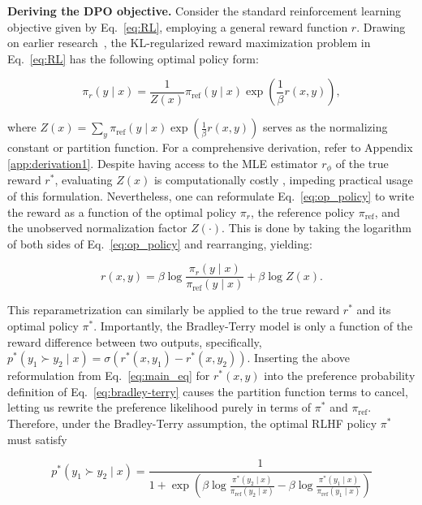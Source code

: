 \textbf{Deriving the DPO objective.} Consider the standard reinforcement learning objective given by Eq.~\ref{eq:RL}, employing a general reward function $r$. Drawing on earlier research~\citep{peters2007reinforcement, peng2019advantage, korbak2022reinforcement, go2023aligning}, the KL-regularized reward maximization problem in Eq.~\ref{eq:RL} has the following optimal policy form:

\begin{equation}\label{eq:op_policy}
    \pi_r(y\mid x) = \frac{1}{Z(x)}\pi_\text{ref}(y\mid x)\exp\left(\frac{1}{\beta}r(x, y)\right),
\end{equation}

where $Z(x) =\sum_{y}\pi_\text{ref}(y\mid x)\exp\left(\frac{1}{\beta}r(x, y)\right)$ serves as the normalizing constant or partition function. For a comprehensive derivation, refer to Appendix \ref{app:derivation1}. Despite having access to the MLE estimator $r_{\phi}$ of the true reward $r^*$, evaluating $Z(x)$ is computationally costly \citep{korbak2022reinforcement, go2023aligning}, impeding practical usage of this formulation. Nevertheless, one can reformulate Eq.~\ref{eq:op_policy} to write the reward as a function of the optimal policy $\pi_r$, the reference policy $\pi_\text{ref}$, and the unobserved normalization factor $Z(\cdot)$. This is done by taking the logarithm of both sides of Eq.~\ref{eq:op_policy} and rearranging, yielding:

\begin{equation}\label{eq:main_eq}
    r(x,y) =\beta \log \frac{\pi_r(y\mid x)}{\pi_\text{ref}(y\mid x)} + \beta \log Z(x).
\end{equation}

This reparametrization can similarly be applied to the true reward $r^*$ and its optimal policy $\pi^*$. Importantly, the Bradley-Terry model is only a function of the reward difference between two outputs, specifically, ${p^*(y_1 \succ y_2 \mid x) = \sigma(r^*(x, y_1) - r^*(x, y_2))}$. Inserting the above reformulation from Eq.~\ref{eq:main_eq} for $r^*(x, y)$ into the preference probability definition of Eq.~\ref{eq:bradley-terry} causes the partition function terms to cancel, letting us rewrite the preference likelihood purely in terms of $\pi^*$ and $\pi_\text{ref}$. Therefore, under the Bradley-Terry assumption, the optimal RLHF policy $\pi^*$ must satisfy

\begin{equation}\label{eq:objective}
    p^*(y_1\succ y_2 \mid x)=\frac{1}{1 + \exp\left(\beta \log \frac{\pi^*(y_2\mid x)}{\pi_\text{ref}(y_2\mid x)} - \beta \log \frac{\pi^*(y_1\mid x)}{\pi_\text{ref}(y_1\mid x)}\right)}
\end{equation}


